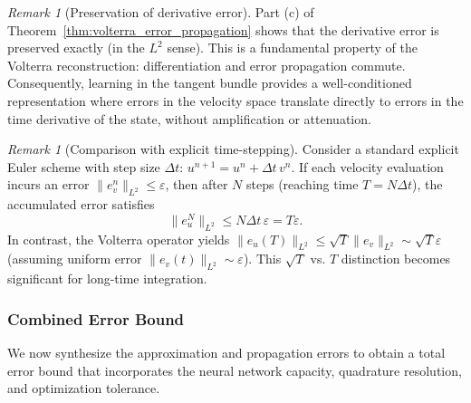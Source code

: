 \documentclass[11pt,reqno]{amsart}
\theoremstyle{plain}
\theoremstyle{definition}
\theoremstyle{remark}
\newtheorem{remark}[theorem]{Remark}
\begin{document}
\begin{remark}[Preservation of derivative error]
Part (c) of Theorem~\ref{thm:volterra_error_propagation} shows that the derivative error is preserved exactly (in the $L^2$ sense). This is a fundamental property of the Volterra reconstruction: differentiation and error propagation commute. Consequently, learning in the tangent bundle provides a well-conditioned representation where errors in the velocity space translate directly to errors in the time derivative of the state, without amplification or attenuation.
\end{remark}

\begin{remark}[Comparison with explicit time-stepping]
Consider a standard explicit Euler scheme with step size $\Delta t$: $u^{n+1} = u^n + \Delta t \, v^n$. If each velocity evaluation incurs an error $\|e_v^n\|_{L^2} \leq \varepsilon$, then after $N$ steps (reaching time $T = N\Delta t$), the accumulated error satisfies
\begin{equation}
    \|e_u^N\|_{L^2} \leq N \Delta t \, \varepsilon = T\varepsilon.
\end{equation}
In contrast, the Volterra operator yields $\|e_u(T)\|_{L^2} \leq \sqrt{T} \|e_v\|_{L^2} \sim \sqrt{T}\varepsilon$ (assuming uniform error $\|e_v(t)\|_{L^2} \sim \varepsilon$). This $\sqrt{T}$ vs. $T$ distinction becomes significant for long-time integration.
\end{remark}

\subsubsection{Combined Error Bound}

We now synthesize the approximation and propagation errors to obtain a total error bound that incorporates the neural network capacity, quadrature resolution, and optimization tolerance.
\end{document}
